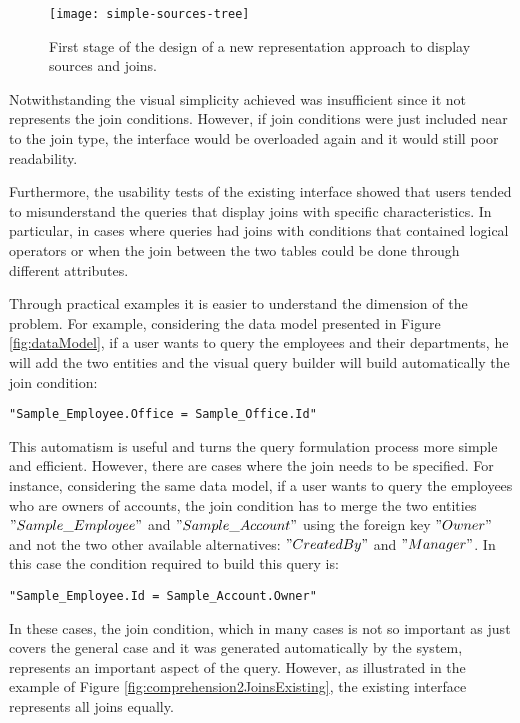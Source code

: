 \begin{figure}[htbp]
	\centering
	\texttt{[image: simple-sources-tree]}
	\caption{First stage of the design of a new representation approach to display sources and joins.}
	\label{fig:simpleSourcesTree}
\end{figure}

Notwithstanding the visual simplicity achieved was insufficient since it not represents the join conditions. However, if join conditions were just included near to the join type, the interface would be overloaded again and it would still poor readability.

Furthermore, the usability tests of the existing interface showed that users tended to misunderstand the queries that display joins with specific characteristics. In particular, in cases where queries had joins with conditions that contained logical operators or when the join between the two tables could be done through different attributes.

Through practical examples it is easier to understand the dimension of the problem. For example, considering the data model presented in Figure \ref{fig:dataModel}, if a user wants to query the employees and their departments, he will add the two entities and the visual query builder will build automatically the join condition:

\begin{center}
  \verb|"Sample_Employee.Office = Sample_Office.Id"|
\end{center}

This automatism is useful and turns the query formulation process more simple and efficient. However, there are cases where the join needs to be specified. For instance, considering the same data model, if a user wants to query the employees who are owners of accounts, the join condition has to merge the two entities $"Sample\_Employee"$ and $"Sample\_Account"$ using the foreign key $"Owner"$ and not the two other available alternatives: $"CreatedBy"$ and $"Manager"$. In this case the condition required to build this query is:

\begin{center}
  \verb|"Sample_Employee.Id = Sample_Account.Owner"|
\end{center}

In these cases, the join condition, which in many cases is not so important as just covers the general case and it was generated automatically by the system, represents an important aspect of the query. However, as illustrated in the example of Figure \ref{fig:comprehension2JoinsExisting}, the existing interface represents all joins equally.

